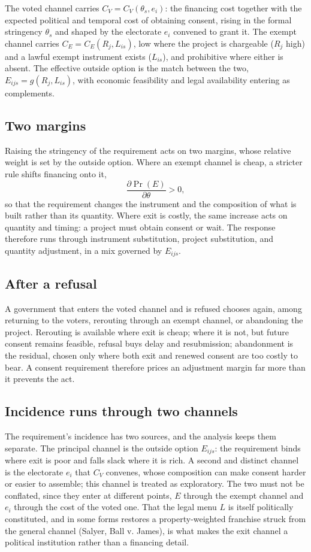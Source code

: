 The voted channel carries $C_V = C_V(\theta_s, e_i)$: the financing cost
together with the expected political and temporal cost of obtaining consent,
rising in the formal stringency $\theta_s$ and shaped by the electorate $e_i$
convened to grant it. The exempt channel carries $C_E = C_E(R_j, L_{is})$, low
where the project is chargeable ($R_j$ high) and a lawful exempt instrument
exists ($L_{is}$), and prohibitive where either is absent. The effective
outside option is the match between the two, $E_{ijs} = g(R_j, L_{is})$, with
economic feasibility and legal availability entering as complements.

\subsection{Two margins}

Raising the stringency of the requirement acts on two margins, whose relative
weight is set by the outside option. Where an exempt channel is cheap, a
stricter rule shifts financing onto it,
\[
\frac{\partial \Pr(E)}{\partial \theta} > 0,
\]
so that the requirement changes the instrument and the composition of what is
built rather than its quantity. Where exit is costly, the same increase acts on
quantity and timing: a project must obtain consent or wait. The response
therefore runs through instrument substitution, project substitution, and
quantity adjustment, in a mix governed by $E_{ijs}$.

\subsection{After a refusal}

A government that enters the voted channel and is refused chooses again, among
returning to the voters, rerouting through an exempt channel, or abandoning the
project. Rerouting is available where exit is cheap; where it is not, but
future consent remains feasible, refusal buys delay and resubmission;
abandonment is the residual, chosen only where both exit and renewed consent
are too costly to bear. A consent requirement therefore prices an adjustment
margin far more than it prevents the act.

\subsection{Incidence runs through two channels}

The requirement's incidence has two sources, and the analysis keeps them
separate. The principal channel is the outside option $E_{ijs}$: the
requirement binds where exit is poor and falls slack where it is rich. A second
and distinct channel is the electorate $e_i$ that $C_V$ convenes, whose
composition can make consent harder or easier to assemble; this channel is
treated as exploratory. The two must not be conflated, since they enter at
different points, $E$ through the exempt channel and $e_i$ through the cost of
the voted one. That the legal menu $L$ is itself politically constituted, and
in some forms restores a property-weighted franchise struck from the general
channel (Salyer, Ball v. James), is what makes the exit channel a political
institution rather than a financing detail.


